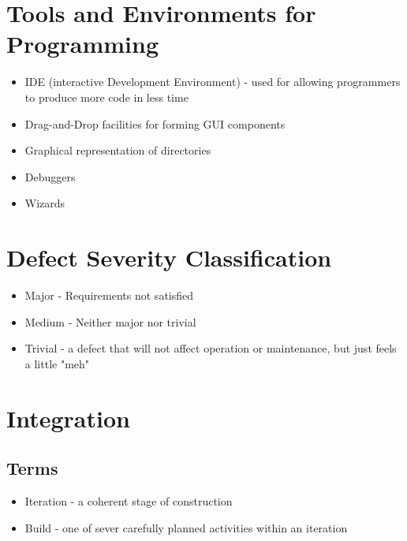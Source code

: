 \documentclass{report}
\begin{document}
		\section{Tools and Environments for Programming}
			\begin{itemize}
				\item IDE (interactive Development Environment) - used for allowing programmers to produce more code in less time
				\item Drag-and-Drop facilities for forming GUI components
				\item Graphical representation of directories
				\item Debuggers
				\item Wizards
			\end{itemize}
		\section{Defect Severity Classification}
			\begin{itemize}
				\item Major - Requirements not satisfied
				\item Medium - Neither major nor trivial
				\item Trivial - a defect that will not affect operation or maintenance, but just feels a little "meh"
			\end{itemize}
		\section{Integration}
			\subsection{Terms}
			    \begin{itemize}
			    	\item Iteration - a coherent stage of construction
			    	\item Build - one of sever carefully planned activities within an iteration
			    \end{itemize}
\end{document}
